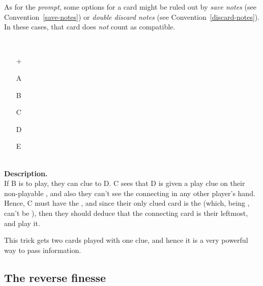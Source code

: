 \begin{remark}
	As for the \emph{prompt}, some options for a card might be ruled out by \emph{save notes} (see Convention~\ref{save-notes}) or \emph{double discard notes} (see Convention~\ref{discard-notes}). In these cases, that card does \emph{not} count as compatible.
\end{remark}

\begin{example} \hfill \\
	\begin{minipage}{0.45\textwidth}
		\begin{itemize}
			\item[\Large +]      
			\item[\Large A]    
			\item[\Large B]    
			\item[\Large C]    
			\item[\Large D]    
			\item[\Large E]    
		\end{itemize}
	\end{minipage}%
	\begin{minipage}{0.55\textwidth}
		\hfill \\
		
		\textbf{Description.} \\
		
		If B is to play, they can clue  to D. C sees that D is given a play clue on their non-playable , and also they can't see the connecting  in any other player's hand. Hence, C must have the , and since their only clued card is the  (which, being , can't be ), then they should deduce that the connecting card is their leftmost, and play it.
	\end{minipage}
\end{example} \vspace{0.15 cm}

This trick gets two cards played with one clue, and hence it is a very powerful way to pass information.

\subsection{The reverse finesse}

